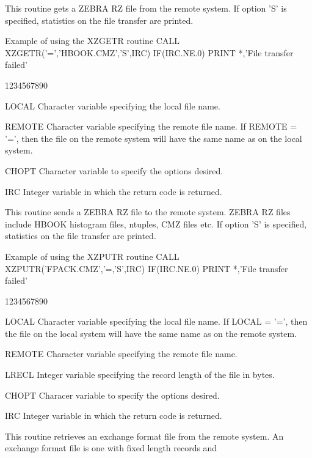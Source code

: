 \par
This routine gets a ZEBRA RZ file from the remote system.
If option 'S' is specified, statistics on the file transfer
are printed.
\begin{XMPt}{Example of using the XZGETR routine}
      CALL XZGETR('=','HBOOK.CMZ','S',IRC)
      IF(IRC.NE.0) PRINT *,'File transfer failed'
\end{XMPt}
\begin{DLtt}{1234567890}
\item[LOCAL]Character variable specifying the local file name.
\item[REMOTE]Character variable specifying the remote file name.
If REMOTE = '=', then the file on the remote system will
have the same name as on the local system.
\item[CHOPT]Character variable to specify the options desired.
\item[IRC]Integer variable in which the return code is returned.
\end{DLtt}
\par
This routine sends a ZEBRA RZ file to the remote system.
ZEBRA RZ files include HBOOK histogram files, ntuples, CMZ files etc.
If option 'S' is specified, statistics on the file transfer
are printed.
\begin{XMPt}{Example of using the XZPUTR routine}
      CALL XZPUTR('FPACK.CMZ','=,'S',IRC)
      IF(IRC.NE.0) PRINT *,'File transfer failed'
\end{XMPt}
\begin{DLtt}{1234567890}
\item[LOCAL]Character variable specifying the local file name.
If LOCAL = '=', then the file on the local system will
have the same name as on the remote system.
\item[REMOTE]Character variable specifying the remote file name.
\item[LRECL]Integer variable specifying the record length of the file in bytes.
\item[CHOPT]Characer variable to specify the options desired.
\item[IRC]Integer variable in which the return code is returned.
\end{DLtt}
\par
This routine retrieves an exchange format file from the remote system.
An exchange format file is one with fixed length records and
